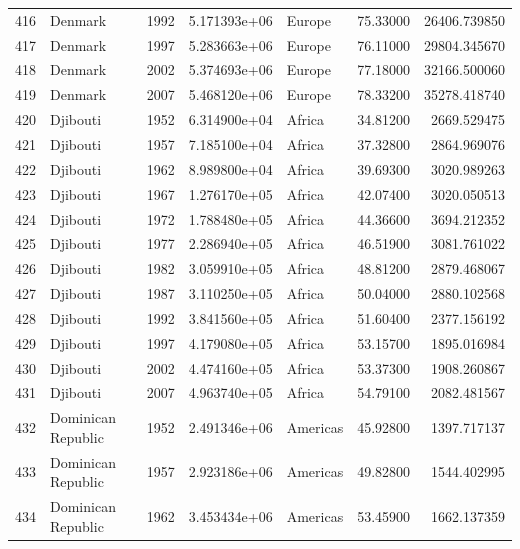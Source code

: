 \documentclass[
  letterpaper,
  DIV=11,
  numbers=noendperiod]{scrreprt}
\begin{document}
\begin{tabular}{llrrlrr}
416  &                   Denmark &  1992 &  5.171393e+06 &    Europe &  75.33000 &   26406.739850 \\
417  &                   Denmark &  1997 &  5.283663e+06 &    Europe &  76.11000 &   29804.345670 \\
418  &                   Denmark &  2002 &  5.374693e+06 &    Europe &  77.18000 &   32166.500060 \\
419  &                   Denmark &  2007 &  5.468120e+06 &    Europe &  78.33200 &   35278.418740 \\
420  &                  Djibouti &  1952 &  6.314900e+04 &    Africa &  34.81200 &    2669.529475 \\
421  &                  Djibouti &  1957 &  7.185100e+04 &    Africa &  37.32800 &    2864.969076 \\
422  &                  Djibouti &  1962 &  8.989800e+04 &    Africa &  39.69300 &    3020.989263 \\
423  &                  Djibouti &  1967 &  1.276170e+05 &    Africa &  42.07400 &    3020.050513 \\
424  &                  Djibouti &  1972 &  1.788480e+05 &    Africa &  44.36600 &    3694.212352 \\
425  &                  Djibouti &  1977 &  2.286940e+05 &    Africa &  46.51900 &    3081.761022 \\
426  &                  Djibouti &  1982 &  3.059910e+05 &    Africa &  48.81200 &    2879.468067 \\
427  &                  Djibouti &  1987 &  3.110250e+05 &    Africa &  50.04000 &    2880.102568 \\
428  &                  Djibouti &  1992 &  3.841560e+05 &    Africa &  51.60400 &    2377.156192 \\
429  &                  Djibouti &  1997 &  4.179080e+05 &    Africa &  53.15700 &    1895.016984 \\
430  &                  Djibouti &  2002 &  4.474160e+05 &    Africa &  53.37300 &    1908.260867 \\
431  &                  Djibouti &  2007 &  4.963740e+05 &    Africa &  54.79100 &    2082.481567 \\
432  &        Dominican Republic &  1952 &  2.491346e+06 &  Americas &  45.92800 &    1397.717137 \\
433  &        Dominican Republic &  1957 &  2.923186e+06 &  Americas &  49.82800 &    1544.402995 \\
434  &        Dominican Republic &  1962 &  3.453434e+06 &  Americas &  53.45900 &    1662.137359 \\

\end{tabular}
\end{document}
